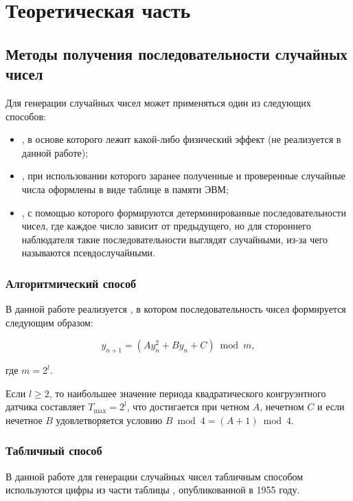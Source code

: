 \chapter{Теоретическая часть}

\section{Методы получения последовательности случайных чисел}

Для генерации случайных чисел может применяться один из следующих способов:
\begin{itemize}
    \item {}, в основе которого лежит какой-либо физический
        эффект (не реализуется в данной работе);
    \item {}, при использовании которого заранее полученные и
        проверенные случайные числа оформлены в виде таблице в памяти ЭВМ;
    \item {}, с помощью которого формируются
        детерминированные последовательности чисел, где каждое число зависит от
        предыдущего, но для стороннего наблюдателя такие последовательности
        выглядят случайными, из-за чего называются псевдослучайными.
\end{itemize}

\subsection{Алгоритмический способ}

В данной работе реализуется , в котором
последовательность чисел формируется следующим образом:

\begin{equation}
    y_{n+1} = (Ay_n^2 + By_n + C) \bmod m,
\end{equation}

где $m = 2^l$.

Если $l \geq 2$, то наибольшее значение периода квадратического конгруэнтного
датчика составляет $T_{\max} = 2^l$, что достигается при четном $A$, нечетном
$C$ и если нечетное $B$ удовлетворяется условию $B \bmod 4 = (A + 1) \bmod 4$.


\subsection{Табличный способ}

В данной работе для генерации случайных чисел табличным способом используются
цифры из части таблицы , опубликованной в 1955 году.

